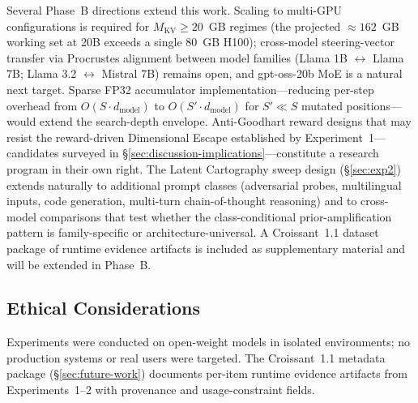 \documentclass{article}
\begin{document}
Several Phase~B directions extend this work. Scaling to multi-GPU configurations is required for $M_{\text{KV}} \ge 20$~GB regimes (the projected $\approx 162$~GB working set at 20B exceeds a single 80~GB H100); cross-model steering-vector transfer via Procrustes alignment between model families (Llama 1B $\leftrightarrow$ Llama 7B; Llama 3.2 $\leftrightarrow$ Mistral 7B) remains open, and gpt-oss-20b MoE is a natural next target. Sparse FP32 accumulator implementation---reducing per-step overhead from $O(S \cdot d_{\text{model}})$ to $O(S' \cdot d_{\text{model}})$ for $S' \ll S$ mutated positions---would extend the search-depth envelope. Anti-Goodhart reward designs that may resist the reward-driven Dimensional Escape established by Experiment~1---candidates surveyed in §\ref{sec:discussion-implications}---constitute a research program in their own right. The Latent Cartography sweep design (§\ref{sec:exp2}) extends naturally to additional prompt classes (adversarial probes, multilingual inputs, code generation, multi-turn chain-of-thought reasoning) and to cross-model comparisons that test whether the class-conditional prior-amplification pattern is family-specific or architecture-universal. A Croissant~1.1 dataset package of runtime evidence artifacts is included as supplementary material and will be extended in Phase~B.

\subsection{Ethical Considerations}

Experiments were conducted on open-weight models in isolated environments; no production systems or real users were targeted. The Croissant~1.1 metadata package (§\ref{sec:future-work}) documents per-item runtime evidence artifacts from Experiments~1--2 with provenance and usage-constraint fields.
\end{document}
